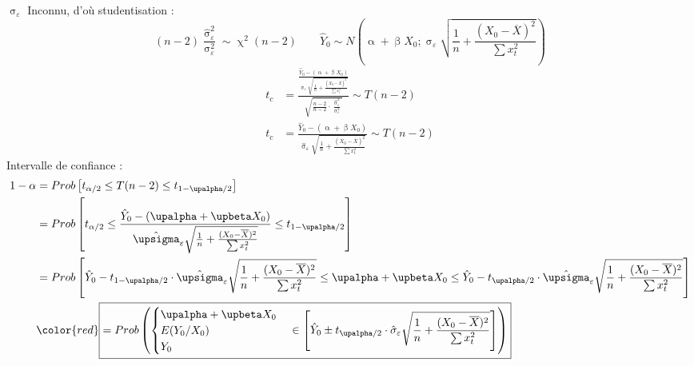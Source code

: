 \documentclass{article}
\newcommand{\sig}{\upsigma_\varepsilon^2}
\newcommand{\sige}{\hat{\upsigma}_\varepsilon^2}
\newcommand{\studn}{t_{\upalpha / 2}}
\newcommand{\studp}{t_{1 - \upalpha / 2}}
\begin{document}
 $\upsigma_\varepsilon$ Inconnu, d'où studentisation :
 \begin{equation*}
 	(n-2) \frac{\sige}{\sig} \sim  \upchi^2 (n-2) \qquad \hat{Y}_0 \sim N \left(\upalpha + \upbeta X_0 ;  \upsigma_\varepsilon \sqrt{\frac{1}{n} + \frac{(X_0-\overline{X})^2}{\sum x_t^2}}\right)
 \end{equation*}
 \begin{equation*}
 	\begin{split}
 	t_c &= \frac{\frac{\hat{Y}_0 - (\upalpha + \upbeta X_0)}{\upsigma_\varepsilon \sqrt{\frac{1}{n} + \frac{(X_0-\overline{X})^2}{\sum x_t^2}}}}{\sqrt{\frac{n-2}{n-2} \cdot \frac{\sige}{\sig}}} \sim T(n-2) \\
 	t_c &=\frac{\hat{Y}_0 - (\upalpha + \upbeta X_0)}{\hat{\upsigma}_\varepsilon \sqrt{\frac{1}{n} + \frac{(X_0-\overline{X})^2}{\sum x_t^2}}} \sim T(n-2)
 	\end{split}
 \end{equation*}
 Intervalle de confiance : 
 \begin{equation*}
 	\begin{split}
 	1 - \alpha &= Prob \left[t_{\alpha/2} \leq T(n-2) \leq t_{1-\upalpha/2}\right] \\
 	&= Prob \left[t_{\alpha/2} \leq \frac{\hat{Y}_0 - (\upalpha + \upbeta X_0)}{\hat{\upsigma}_\varepsilon \sqrt{\frac{1}{n} + \frac{(X_0-\overline{X})^2}{\sum x_t^2}}} \leq t_{1-\upalpha/2}\right] \\
 	&= Prob \left[\hat{Y}_0 - \studp \cdot \hat{\upsigma}_\varepsilon \sqrt{\frac{1}{n} + \frac{(X_0 - \overline{X})^2}{\sum x_t^2}} \leq \upalpha + \upbeta X_0 \leq \hat{Y}_0 - \studn \cdot \hat{\upsigma}_\varepsilon \sqrt{\frac{1}{n} + \frac{(X_0 - \overline{X})^2}{\sum x_t^2}} \right] \\
 	&{\color{red}\boxed{=  Prob\left(\begin{cases}\upalpha + \upbeta X_0 \\ E(Y_0/X_0) \\ Y_0\end{cases} \in \left[\hat{Y}_0 \pm \studn \cdot \hat{\sigma}_\varepsilon \sqrt{\frac{1}{n} + \frac{(X_0 - \overline{X})^2}{\sum x_t^2}}\right]\right)}}
 	\end{split}
 \end{equation*}
\end{document}
